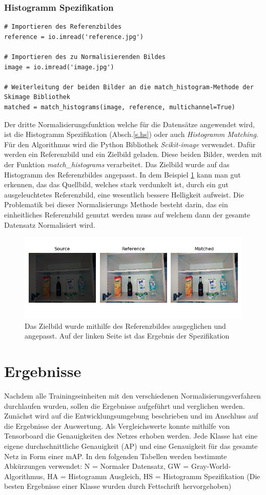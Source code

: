 \documentclass[a4paper,12pt,oneside]{article}
\begin{document}
\subsubsection{Histogramm Spezifikation}
\begin{lstlisting}
# Importieren des Referenzbildes
reference = io.imread('reference.jpg')

# Importieren des zu Normalisierenden Bildes
image = io.imread('image.jpg')

# Weiterleitung der beiden Bilder an die match_histogram-Methode der Skimage Bibliothek
matched = match_histograms(image, reference, multichannel=True)
\end{lstlisting}
Der dritte Normalisierungsfunktion welche für die Datensätze angewendet wird, ist die Histogramm Spezifikation (Absch.\ref{s.hs}) oder auch \textit{Histogramm Matching}. Für den Algorithmus wird die Python Bibliothek \textit{Scikit-image} verwendet. Dafür werden ein Referenzbild und ein Zielbild geladen. Diese beiden Bilder, werden mit der Funktion \textit{match\_histograms} verarbeitet. Das Zielbild wurde auf das Histogramm des Referenzbildes angepasst. In dem Beispiel \ref{img:histogramspez} kann man gut erkennen, das das Quellbild, welches stark verdunkelt ist, durch ein gut ausgeleuchtetes Referenzbild, eine wesentlich bessere Helligkeit aufweist. Die Problematik bei dieser Normalisierungs Methode besteht darin, das ein einheitliches Referenzbild genutzt werden muss auf welchem dann der gesamte Datensatz Normalisiert wird.
\begin{figure}
	[h]
	\centering
	\includegraphics[scale=0.8]{Sources/HS_beispiel.png}
	\caption{Das Zielbild wurde mithilfe des Referenzbildes ausgeglichen und angepasst. Auf der linken Seite ist das Ergebnis der Spezifikation}
	\label{img:histogramspez}
\end{figure}
  \newpage
  \section{Ergebnisse}
Nachdem alle Trainingseinheiten mit den verschiedenen Normalisierungsverfahren durchlaufen wurden, sollen die Ergebnisse aufgeführt und verglichen werden. Zunächst wird auf die Entwicklungsumgebung beschrieben und im Anschluss auf die Ergebnisse der Auswertung. Als Vergleichswerte konnte mithilfe von Tensorboard die Genauigkeiten des Netzes erhoben werden. Jede Klasse hat eine eigene durchschnittliche Genauigkeit (AP) und eine Genauigkeit für das gesamte Netz in Form einer mAP. In den folgenden Tabellen werden bestimmte Abkürzungen verwendet: N = Normaler Datensatz, GW = Gray-World-Algorithmus, HA = Histogramm Ausgleich, HS = Histogramm Spezifikation (Die besten Ergebnisse einer Klasse wurden durch Fettschrift hervorgehoben) 
\end{document}
